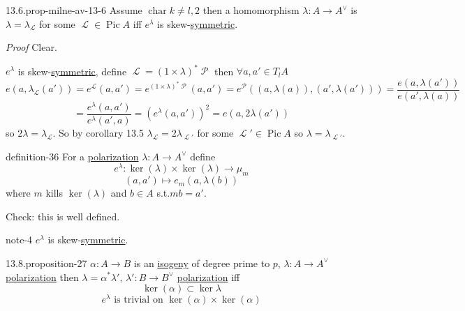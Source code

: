 \documentclass[10pt,]{book}
\makeatletter
\renewcommand*{\proofname}{Proof}
\renewenvironment{proof}[1][\proofname]{\par
  \pushQED{\qed}%
  \normalfont \topsep6\p@\@plus6\p@\relax
  \trivlist
  \item\relax
    {\itshape
    #1\@addpunct{.}}\hspace\labelsep\ignorespaces
}{%
  \popQED\endtrivlist\@endpefalse
}
\numberwithin{equation}{section}
\newcommand{\sheaf}[1]{\operatorname{\mathcal{#1}}}
\DeclareMathOperator{\Pic}{Pic}
\DeclareMathOperator{\characteristic}{char}
\makeatother
\begin{document}
\begin{proposition}{13.6.}{}{prop-milne-av-13-6}%
\hypertarget{p-316}{}%
Assume \(\characteristic k \ne l,2\) then a homomorphism \(\lambda\colon A\to A^\vee\) is \(\lambda = \lambda_{\sheaf L}\) for some \(\sheaf L \in \Pic A\) iff \(e^\lambda\) is skew-\hyperref[def-princ-pol]{symmetric}.%
\end{proposition}
\begin{proof}\hypertarget{proof-53}{}
\hypertarget{case-11}{}\hypertarget{p-317}{}%
Clear.%
\par\medskip\noindent
\hypertarget{case-12}{}\hypertarget{p-318}{}%
\(e^\lambda\) is skew-\hyperref[def-princ-pol]{symmetric}, define \(\sheaf L = (1 \times \lambda)^* \sheaf P\) then  \(\forall a,a' \in T_l A\)%
\begin{equation*}
e(a,\lambda_{\sheaf L} (a') ) = e^{\sheaf L}(a,a') = e^{(1\times \lambda)^* \sheaf P} (a,a') = e^{\sheaf P}((a,\lambda (a)), (a',\lambda(a'))) = \frac{e(a,\lambda (a'))}{ e(a',\lambda(a))}
\end{equation*}
%
\begin{equation*}
= \frac{e^\lambda(a,a')}{ e^\lambda(a',a)} = (e^\lambda(a,a'))^2 = e(a,2\lambda (a'))
\end{equation*}
so \(2\lambda = \lambda_{\sheaf L}\). So by corollary 13.5 \(\lambda_{\sheaf L} = 2\lambda_{\sheaf L'}\) for some \(\sheaf L' \in \Pic A\) so \(\lambda = \lambda_{\sheaf L'}\).%
\end{proof}
\begin{definition}{}{definition-36}%
\hypertarget{p-319}{}%
For a  \hyperref[def-polarization]{polarization} \(\lambda \colon A\to A^\vee\) define%
\begin{equation*}
e^{\lambda} \colon \ker(\lambda)\times \ker(\lambda) \to \mu_m
\end{equation*}
%
\begin{equation*}
(a,a')\mapsto e_m(a,\lambda(b))
\end{equation*}
where \(m \) kills \(\ker(\lambda)\) and \(b \in A\) s.t.\(mb = a'\).%
\end{definition}
\hypertarget{p-320}{}%
Check: this is well defined.%
\begin{note}{}{note-4}%
\hypertarget{p-321}{}%
\(e^\lambda\) is skew-\hyperref[def-princ-pol]{symmetric}.%
\end{note}
\begin{proposition}{13.8.}{}{proposition-27}%
\hypertarget{p-322}{}%
\(\alpha\colon A \to B\) is an \hyperref[def-supersing-isog-isog]{isogeny} of degree prime to \(p\), \(\lambda\colon A\to A^\vee\) \hyperref[def-polarization]{polarization} then \(\lambda = \alpha^* \lambda', \,\lambda' \colon B\to B^\vee\) \hyperref[def-polarization]{polarization} iff%
\begin{equation*}
\ker(\alpha) \subset \ker \lambda
\end{equation*}
%
\begin{equation*}
e^{\lambda} \text{ is trivial on } \ker (\alpha)\times \ker(\alpha)
\end{equation*}
%
\end{proposition}
\end{document}
